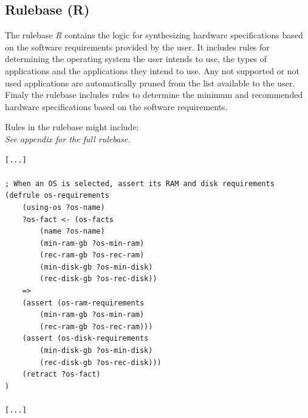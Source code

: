 \documentclass{article}
\begin{document}

\subsection{Rulebase (R)}


The rulebase \textit{R} contains the logic for synthesizing hardware specifications based on the software requirements provided by the user. It includes rules for determining the operating system the user intends to use, the types of applications and the applications they intend to use. Any not supported or not used applications are automatically pruned from the list available to the user. Finaly the rulebase includes rules to determine the minimum and recommended hardware specifications based on the software requirements.


Rules in the rulebase might include:\\
\indent\small{\it See appendix for the full rulebase.}

\begin{file}
\begin{lstlisting}
[...]

; When an OS is selected, assert its RAM and disk requirements
(defrule os-requirements
    (using-os ?os-name)
    ?os-fact <- (os-facts
        (name ?os-name)
        (min-ram-gb ?os-min-ram)
        (rec-ram-gb ?os-rec-ram)
        (min-disk-gb ?os-min-disk)
        (rec-disk-gb ?os-rec-disk))
    =>
    (assert (os-ram-requirements
        (min-ram-gb ?os-min-ram)
        (rec-ram-gb ?os-rec-ram)))
    (assert (os-disk-requirements
        (min-disk-gb ?os-min-disk)
        (rec-disk-gb ?os-rec-disk)))
    (retract ?os-fact)
)

[...]
\end{lstlisting}
\end{file}
\end{document}
